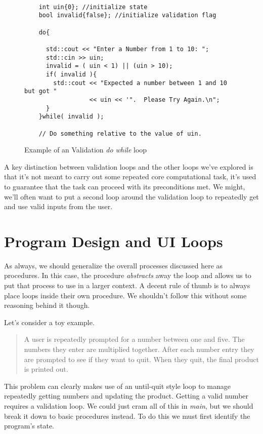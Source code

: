 \documentclass[]{tufte-handout}
\begin{document}
\begin{figure}
  \begin{lstlisting}

    int uin{0}; //initialize state
    bool invalid{false}; //initialize validation flag

    do{

      std::cout << "Enter a Number from 1 to 10: ";
      std::cin >> uin;
      invalid = ( uin < 1) || (uin > 10);
      if( invalid ){
        std::cout << "Expected a number between 1 and 10 but got "
                  << uin << '".  Please Try Again.\n";
      }
    }while( invalid );

    // Do something relative to the value of uin.
  \end{lstlisting}
  \caption{Example of an Validation \textit{do while} loop}
\label{loop:validation}
\end{figure}

A key distinction between validation loops and the other loops we've explored is that it's not meant to carry out some repeated core computational task, it's used to guarantee that the task can proceed with its preconditions met. We might, we'll often want to put a second loop around the validation loop to repeatedly get and use valid inputs from the user.

\section{Program Design and UI Loops}

As always, we should generalize the overall processes discussed here as procedures. In this case, the procedure \textit{abstracts} away the loop and allows us to put that process to use in a larger context. A decent rule of thumb is to always place loops inside their own procedure. We shouldn't follow this without some reasoning behind it though.

Let's consider a toy example.
\begin{quote}
  A user is repeatedly prompted for a number between one and five. The numbers they enter are multiplied together. After each number entry they are prompted to see if they want to quit. When they quit, the final product is printed out.
\end{quote}

This problem can clearly makes use of an until-quit style loop to manage repeatedly getting numbers and updating the product. Getting a valid number requires a validation loop. We could just cram all of this in \textit{main}, but we should break it down to basic procedures instead. To do this we must first identify the program's state.
\end{document}

